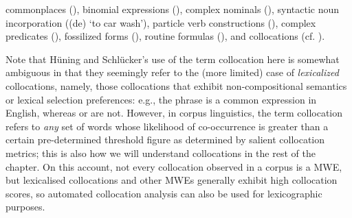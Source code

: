 \documentclass[output=paper,colorlinks,citecolor=brown]{langscibook}
\begin{document}
    commonplaces (),
    binomial expressions (),
    complex nominals (),
    syntactic noun incorporation ((de)  `to car wash'),
    particle verb constructions (),
    complex predicates (),
    fossilized forms (),
    routine formulas (), and
   collocations %
    (cf.
    \cite{Evert2005,Evert2009,Schluecker2019CLU,FinkbeinerSchluecker2019CompoundsMWE}).

Note that Hüning and Schlücker's use of the term collocation here is somewhat ambiguous in that they seemingly refer to the (more limited) case of \emph{lexicalized} collocations, namely, those collocations that exhibit non-com\-po\-si\-tio\-nal semantics or lexical selection preferences:
e.g., the phrase  is a common expression in English, whereas  or  are not. %
However, in corpus linguistics, %
the term collocation refers to \emph{any} set of words whose likelihood of co-occurrence is greater than a certain pre-determined threshold figure as determined by salient collocation metrics; this is also how we will understand collocations in the rest of the chapter.
On this account, not every collocation observed in a corpus is a MWE, but lexicalised collocations and other MWEs generally exhibit high collocation scores, so automated collocation analysis can also be used for lexicographic purposes.
\end{document}
